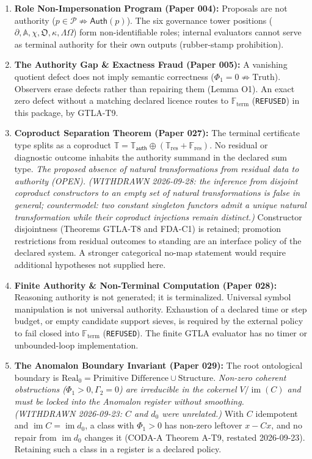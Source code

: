 \documentclass[
  11pt,
]{article}
\providecommand{\tightlist}{%
  \setlength{\itemsep}{0pt}\setlength{\parskip}{0pt}}
\providecommand{\st}[1]{\emph{#1}}
\begin{document}
\begin{enumerate}
\def\labelenumi{\arabic{enumi}.}
\tightlist
\item
  \textbf{Role Non-Impersonation Program (Paper 004):} Proposals are not authority (\(p \in \mathcal{P} \not\Rightarrow \mathsf{Auth}(p)\)). The six governance tower positions (\(\partial, \mathbb{A}, \chi, \mathfrak{O}, \kappa, \Lambda\Omega\)) form non-identifiable roles; internal evaluators cannot serve as terminal authority for their own outputs (rubber-stamp prohibition).
\item
  \textbf{The Authority Gap \& Exactness Fraud (Paper 005):} A vanishing quotient defect does not imply semantic correctness (\(\Phi_1 = 0 \not\Rightarrow \text{Truth}\)). Observers erase defects rather than repairing them (Lemma O1). An exact zero defect without a matching declared licence routes to \(\mathbb{F}_{\mathrm{term}}\) (\texttt{REFUSED}) in this package, by GTLA-T9.
\item
  \textbf{Coproduct Separation Theorem (Paper 027):} The terminal certificate type splits as a coproduct \(\mathbb{T} = \mathbb{T}_{\mathsf{auth}} \oplus (\mathbb{T}_{\mathrm{res}} + \mathbb{F}_{\mathrm{res}})\). No residual or diagnostic outcome inhabits the authority summand in the declared sum type. \st{The proposed absence of natural transformations from residual data to authority (OPEN).} \emph{(WITHDRAWN 2026-09-28: the inference from disjoint coproduct constructors to an empty set of natural transformations is false in general; countermodel: two constant singleton functors admit a unique natural transformation while their coproduct injections remain distinct.)} Constructor disjointness (Theorems GTLA-T8 and FDA-C1) is retained; promotion restrictions from residual outcomes to standing are an interface policy of the declared system. A stronger categorical no-map statement would require additional hypotheses not supplied here.
\item
  \textbf{Finite Authority \& Non-Terminal Computation (Paper 028):} Reasoning authority is not generated; it is terminalized. Universal symbol manipulation is not universal authority. Exhaustion of a declared time or step budget, or empty candidate support sieves, is required by the external policy to fail closed into \(\mathbb{F}_{\mathrm{term}}\) (\texttt{REFUSED}). The finite GTLA evaluator has no timer or unbounded-loop implementation.
\item
  \textbf{The Anomalon Boundary Invariant (Paper 029):} The root ontological boundary is \(\mathrm{Real}_0 = \text{Primitive Difference} \cup \text{Structure}\). \st{Non-zero coherent obstructions ($\Phi_1 > 0, \Gamma_2 = 0$) are irreducible in the cokernel $V / \operatorname{im}(C)$ and must be locked into the Anomalon register without smoothing.} \emph{(WITHDRAWN 2026-09-23: \(C\) and \(d_0\) were unrelated.)} With \(C\) idempotent and \(\operatorname{im} C = \operatorname{im} d_0\), a class with \(\Phi_1 > 0\) has non-zero leftover \(x - Cx\), and no repair from \(\operatorname{im} d_0\) changes it (CODA-A Theorem A-T9, restated 2026-09-23). Retaining such a class in a register is a declared policy.

\end{enumerate}
\end{document}
